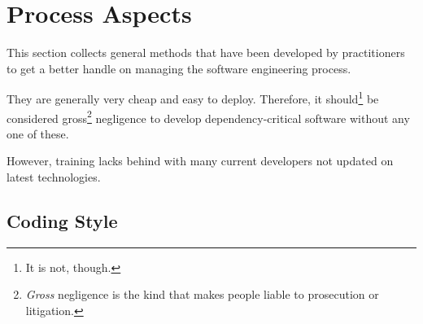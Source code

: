 \section{Process Aspects}

This section collects general methods that have been developed by practitioners to get a better handle on managing the software engineering process.

They are generally very cheap and easy to deploy.
Therefore, it should\footnote{It is not, though.} be considered gross\footnote{\emph{Gross} negligence is the kind that makes people liable to prosecution or litigation.} negligence to develop dependency-critical software without any one of these.

However, training lacks behind with many current developers not updated on latest technologies.

\subsection{Coding Style}
  
